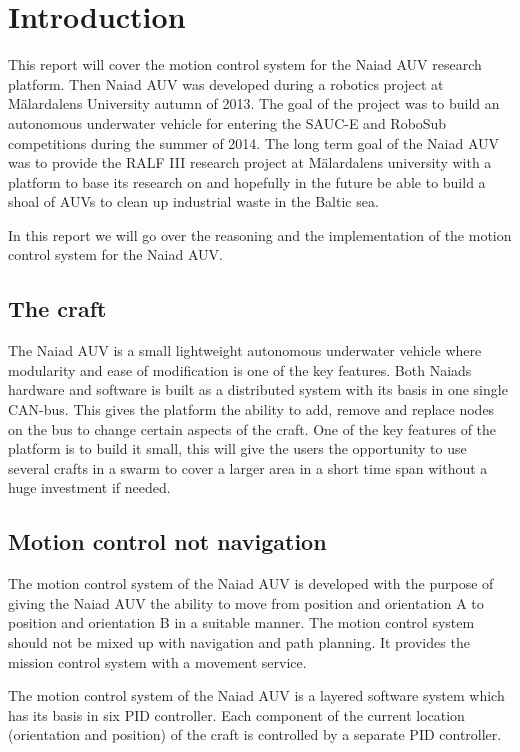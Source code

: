 \section{Introduction}\label{sec:introduction}

This report will cover the motion control system for the Naiad AUV research platform. Then Naiad AUV was developed during a robotics project at M\"alardalens University autumn of 2013. The goal of the project was to build an autonomous underwater vehicle for entering the SAUC-E and RoboSub competitions during the summer of 2014. The long term goal of the Naiad AUV was to provide the RALF III research project at M\"alardalens university with a platform to base its research on and hopefully in the future be able to build a shoal of AUVs to clean up industrial waste in the Baltic sea.

In this report we will go over the reasoning and the implementation of the motion control system for the Naiad AUV. 


\subsection{The craft}

The Naiad AUV is a small lightweight autonomous underwater vehicle where modularity and ease of modification is one of the key features. Both Naiads hardware and software is built as a distributed system with its basis in one single CAN-bus. This gives the platform the ability to add, remove and replace nodes on the bus to change certain aspects of the craft. One of the key features of the platform is to build it small, this will give the users the opportunity to use several crafts in a swarm to cover a larger area in a short time span without a huge investment if needed.

\subsection{Motion control not navigation}

The motion control system of the Naiad AUV is developed with the purpose of giving the Naiad AUV the ability to move from position and orientation A to position and orientation B in a suitable manner. The motion control system should not be mixed up with navigation and path planning. It provides the mission control system with a movement service.

The motion control system of the Naiad AUV is a layered software system which has its basis in six PID controller. Each component of the current location (orientation and position) of the craft is controlled by a separate PID controller. 

